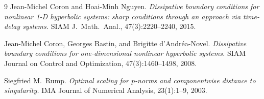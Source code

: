 \documentclass{article}
\begin{document}
\begin{thebibliography}{9}
 Jean-Michel Coron and Hoai-Minh Nguyen. \textit{Dissipative boundary conditions for nonlinear 1-D hyperbolic systems: sharp conditions through an approach via time-delay systems.} SIAM J.\ Math.\ Anal., 47(3):2220--2240, 2015.

 Jean-Michel Coron, Georges Bastin, and Brigitte d'Andr\'ea-Novel. \textit{Dissipative boundary conditions for one-dimensional nonlinear hyperbolic systems.} SIAM Journal on Control and Optimization, 47(3):1460--1498, 2008.

 Siegfried M.\ Rump. \textit{Optimal scaling for $p$-norms and componentwise distance to singularity.} IMA Journal of Numerical Analysis, 23(1):1--9, 2003.
\end{thebibliography}
\end{document}
